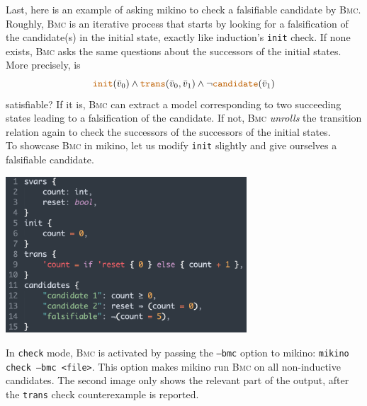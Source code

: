 \documentclass{easychair}
\newcommand{\mkn}{mikino}
\newcommand{\bmc}{\textsc{Bmc}}
\newcommand{\ita}[1]{\textit{#1}}
\newcommand{\code}[1]{\textcolor{orange!75!black}{\texttt{#1}}}
\newcommand{\picwidth}{9cm}
\newcommand{\vars}{\bar{v}}
\newcommand{\init}{\code{init}}
\newcommand{\trans}{\code{trans}}
\newcommand{\cand}{\code{candidate}}
\begin{document}
Last, here is an example of asking \mkn{} to check a falsifiable candidate by \bmc{}. 
Roughly, \bmc{} is an iterative process that starts by looking for
a falsification of the candidate(s) in the initial state, exactly like induction's \init{} check.
If none exists, \bmc{} asks the same questions about the successors of the initial states. More
precisely, is%
%
\[
    \init(\vars_0) \land \trans(\vars_0, \vars_1) \land \neg \cand(\vars_1)
\]
%
satisfiable? If it is, \bmc{} can extract a model corresponding to two succeeding states leading to
a falsification of the candidate. If not, \bmc{} \ita{unrolls} the transition relation again to
check the successors of the successors of the initial states.
%
\\
%
To showcase \bmc{} in \mkn{}, let us modify \init{} slightly and give ourselves a falsifiable
candidate.
%
\begin{center}
    \includegraphics[width=\picwidth]{../rsc/stopwatch_3.png}
\end{center}

In \code{check} mode, \bmc{} is activated by passing the \code{--bmc} option to \mkn{}:
\code{mikino check --bmc <file>}. This option makes \mkn{} run \bmc{} on all non-inductive
candidates. The second image only shows the relevant part of the output, after the \trans{} check
counterexample is reported.
\end{document}
